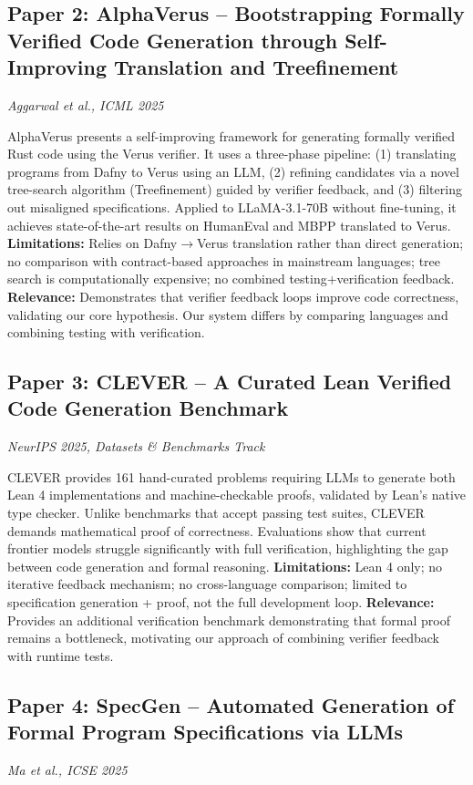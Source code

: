 \documentclass[11pt,a4paper]{article}
\begin{document}
\subsection{Paper 2: AlphaVerus -- Bootstrapping Formally Verified Code Generation through Self-Improving Translation and Treefinement}
\textit{Aggarwal et al., ICML 2025} \cite{alphaVerus2025}

AlphaVerus presents a self-improving framework for generating formally verified Rust code using the Verus verifier. It uses a three-phase pipeline: (1) translating programs from Dafny to Verus using an LLM, (2) refining candidates via a novel tree-search algorithm (Treefinement) guided by verifier feedback, and (3) filtering out misaligned specifications. Applied to LLaMA-3.1-70B without fine-tuning, it achieves state-of-the-art results on HumanEval and MBPP translated to Verus. \textbf{Limitations:} Relies on Dafny$\to$Verus translation rather than direct generation; no comparison with contract-based approaches in mainstream languages; tree search is computationally expensive; no combined testing+verification feedback. \textbf{Relevance:} Demonstrates that verifier feedback loops improve code correctness, validating our core hypothesis. Our system differs by comparing languages and combining testing with verification.

\subsection{Paper 3: CLEVER -- A Curated Lean Verified Code Generation Benchmark}
\textit{NeurIPS 2025, Datasets \& Benchmarks Track} \cite{clever2025}

CLEVER provides 161 hand-curated problems requiring LLMs to generate both Lean 4 implementations and machine-checkable proofs, validated by Lean's native type checker. Unlike benchmarks that accept passing test suites, CLEVER demands mathematical proof of correctness. Evaluations show that current frontier models struggle significantly with full verification, highlighting the gap between code generation and formal reasoning. \textbf{Limitations:} Lean 4 only; no iterative feedback mechanism; no cross-language comparison; limited to specification generation + proof, not the full development loop. \textbf{Relevance:} Provides an additional verification benchmark demonstrating that formal proof remains a bottleneck, motivating our approach of combining verifier feedback with runtime tests.

\subsection{Paper 4: SpecGen -- Automated Generation of Formal Program Specifications via LLMs}
\textit{Ma et al., ICSE 2025} \cite{specgen2025}
\end{document}
